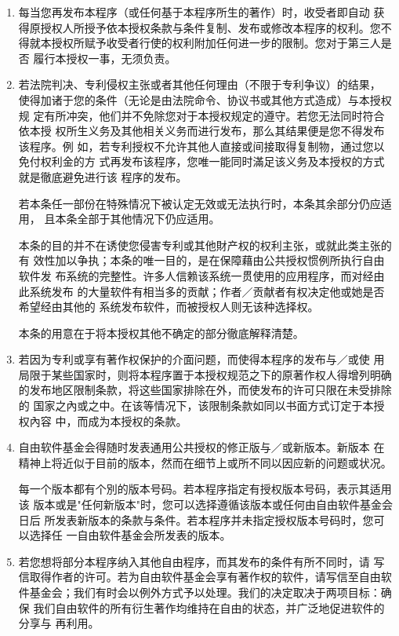 \begin{enumerate}
\item 每当您再发布本程序（或任何基于本程序所生的著作）时，收受者即自动
获得原授权人所授予依本授权条款与条件复制、发布或修改本程序的权利。您不
得就本授权所赋予收受者行使的权利附加任何进一步的限制。您对于第三人是否
履行本授权一事，无须负责。

\item 若法院判决、专利侵权主张或者其他任何理由（不限于专利争议）的结果，
使得加诸于您的条件（无论是由法院命令、协议书或其他方式造成）与本授权规
定有所冲突，他们并不免除您对于本授权规定的遵守。若您无法同时符合依本授
权所生义务及其他相关义务而进行发布，那么其结果便是您不得发布该程序。例
如，若专利授权不允许其他人直接或间接取得复制物，通过您以免付权利金的方
式再发布该程序，您唯一能同时滿足该义务及本授权的方式就是徹底避免进行该
程序的发布。

若本条任一部份在特殊情况下被认定无效或无法执行时，本条其余部分仍应适用，
且本条全部于其他情况下仍应适用。

本条的目的并不在诱使您侵害专利或其他財产权的权利主张，或就此类主张的有
效性加以争执；本条的唯一目的，是在保障藉由公共授权惯例所执行自由软件发
布系统的完整性。许多人信赖该系统一贯使用的应用程序，而对经由此系统发布
的大量软件有相当多的贡献；作者／贡献者有权决定他或她是否希望经由其他的
系统发布软件，而被授权人则无该种选择权。

本条的用意在于将本授权其他不确定的部分徹底解释清楚。

\item 若因为专利或享有著作权保护的介面问题，而使得本程序的发布与／或使
用局限于某些国家时，则将本程序置于本授权规范之下的原著作权人得增列明确
的发布地区限制条款，将这些国家排除在外，而使发布的许可只限在未受排除的
国家之內或之中。在该等情况下，该限制条款如同以书面方式订定于本授权內容
中，而成为本授权的条款。

\item 自由软件基金会得随时发表通用公共授权的修正版与／或新版本。新版本
在精神上将近似于目前的版本，然而在细节上或所不同以因应新的问题或状况。

每一个版本都有个別的版本号码。若本程序指定有授权版本号码，表示其适用该
版本或是"任何新版本"时，您可以选择遵循该版本或任何由自由软件基金会日后
所发表新版本的条款与条件。若本程序并未指定授权版本号码时，您可以选择任
一自由软件基金会所发表的版本。

\item 若您想将部分本程序纳入其他自由程序，而其发布的条件有所不同时，请
写信取得作者的许可。若为自由软件基金会享有著作权的软件，请写信至自由软
件基金会；我们有时会以例外方式予以处理。我们的决定取决于两项目标：确保
我们自由软件的所有衍生著作均维持在自由的状态，并广泛地促进软件的分享与
再利用。


\end{enumerate}
